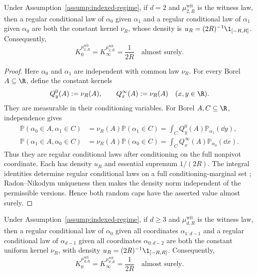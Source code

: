 \begin{proposition}
\label{prop:degree-two-witness-kernels}
Under Assumption~\ref{assump:indexed-regime}, if $d=2$ and
$\mu^{\mathrm{wit}}_{2,R}$ is the witness law, then a regular conditional
law of $\alpha_0$ given $\alpha_1$ and a regular conditional law of
$\alpha_1$ given $\alpha_0$ are both the constant kernel $\nu_R$, whose
density is $u_R=(2R)^{-1}\1_{[-R,R]}$.  Consequently,
\[
K_0^{\mu^{\mathrm{wit}}_{2,R}}
=K_\infty^{\mu^{\mathrm{wit}}_{2,R}}
=\frac1{2R}
\quad\text{almost surely}.
\]
\end{proposition}

\begin{proof}
Here $\alpha_0$ and $\alpha_1$ are independent with common law $\nu_R$.
For every Borel $A\subseteq\R$, define the constant kernels
\[
Q^0_y(A):=\nu_R(A),\qquad Q^\infty_x(A):=\nu_R(A)
\quad(x,y\in\R).
\]
They are measurable in their conditioning variables.  For Borel
$A,C\subseteq\R$, independence gives
\[
\begin{aligned}
\mathbb P(\alpha_0\in A,\alpha_1\in C)
&=\nu_R(A)\mathbb P(\alpha_1\in C)
=\int_CQ^0_y(A)\mathbb P_{\alpha_1}(\dd y),\\
\mathbb P(\alpha_1\in A,\alpha_0\in C)
&=\nu_R(A)\mathbb P(\alpha_0\in C)
=\int_CQ^\infty_x(A)\mathbb P_{\alpha_0}(\dd x).
\end{aligned}
\]
Thus they are regular conditional laws after conditioning on the full
nonpivot coordinate.  Each has density $u_R$ and essential supremum
$1/(2R)$.  The integral identities determine regular conditional laws on a
full conditioning-marginal set \cite[Theorem~6.3]{Kallenberg2002};
Radon--Nikodym uniqueness \cite[Theorem~3.8]{Folland1999} then makes the
density norm independent of the permissible versions.  Hence both random
caps have the asserted value almost surely.
\end{proof}

\begin{proposition}
\label{prop:higher-degree-witness-kernels}
Under Assumption~\ref{assump:indexed-regime}, if $d\geq3$ and
$\mu^{\mathrm{wit}}_{d,R}$ is the witness law, then a regular conditional
law of $\alpha_0$ given all coordinates $\alpha_{1:d-1}$ and a regular
conditional law of $\alpha_{d-1}$ given all coordinates
$\alpha_{0:d-2}$ are both the constant uniform kernel $\nu_R$, with density
$u_R=(2R)^{-1}\1_{[-R,R]}$.  Consequently,
\[
K_0^{\mu^{\mathrm{wit}}_{d,R}}
=K_\infty^{\mu^{\mathrm{wit}}_{d,R}}
=\frac1{2R}
\quad\text{almost surely}.
\]
\end{proposition}

